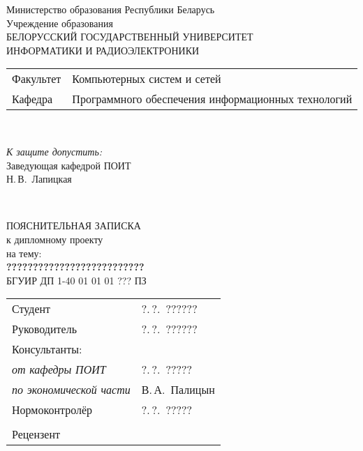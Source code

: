 \begin{titlepage}
  \begin{center}
    Министерство образования Республики Беларусь\\[1em]
    Учреждение образования\\
    БЕЛОРУССКИЙ ГОСУДАРСТВЕННЫЙ УНИВЕРСИТЕТ \\
    ИНФОРМАТИКИ И РАДИОЭЛЕКТРОНИКИ\\[1em]

    \begin{minipage}{\textwidth}
      \begin{flushleft}
        \begin{tabular}{ l l }
          Факультет & Компьютерных систем и сетей\\
          Кафедра   & Программного обеспечения информационных технологий
        \end{tabular}
      \end{flushleft}
    \end{minipage}\\[1em]

    \begin{flushright}
      \begin{minipage}{0.4\textwidth}
        \textit{К защите допустить:}\\[0.8em]
        Заведующая кафедрой ПОИТ\\[0.45em]
        \underline{\hspace*{2.8cm}} Н.\,В.~Лапицкая
      \end{minipage}\\[2.2em]
    \end{flushright}

    {ПОЯСНИТЕЛЬНАЯ ЗАПИСКА}\\
    {к дипломному проекту}\\
    {на тему:}\\[1em]
    \textbf{\large ??????????????????????????}\\[1em]


    {БГУИР ДП 1-40 01 01 01 ??? ПЗ}\\[2em]
    
    \begin{tabular}{ p{}p{} }
      Студент & ?.\,?.~?????? \\
      Руководитель & ?.\,?.~?????? \\
      Консультанты: &\\
      \hspace*{3ex}\emph{от кафедры ПОИТ} & ?.\,?.~????? \\
      \hspace*{3ex}\emph{по экономической части} & В.\,А.~Палицын \\
      Нормоконтролёр & ?.\,?.~?????\\
      & \\
      Рецензент &
    \end{tabular}
    

\end{center}
\end{titlepage}
